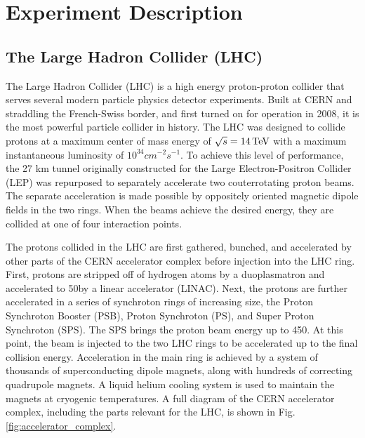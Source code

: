 \chapter{Experiment Description}

\section{The Large Hadron Collider (LHC)}
The Large Hadron Collider (LHC) is a high energy proton-proton collider that serves several modern particle physics detector experiments. 
Built at CERN and straddling the French-Swiss border, and first turned on for operation in 2008, it is the most powerful particle collider in history. 
The LHC was designed to collide protons at a maximum center of mass energy of $\sqrt s = 14\,\text{Te\hspace{-.08em}V}$ 
with a maximum instantaneous luminosity of $10^{34}cm^{-2}s^{-1}$. To achieve this level of performance, the 27 km tunnel 
originally constructed for the Large Electron-Positron Collider (LEP) was repurposed to separately 
accelerate two couterrotating proton beams. The separate acceleration is made possible by oppositely oriented 
magnetic dipole fields in the two rings. When the beams achieve the desired energy, they are collided at one of four interaction points. 

The protons collided in the LHC are first gathered, bunched, and accelerated by other parts of the CERN accelerator complex before injection into the LHC ring. 
First, protons are stripped off of hydrogen atoms by a duoplasmatron and accelerated to 50\MeV by a linear accelerator (LINAC). Next, the protons are further accelerated 
in a series of synchroton rings of increasing size, the Proton Synchroton Booster (PSB), Proton Synchroton (PS), and Super Proton Synchroton (SPS). The SPS brings the 
proton beam energy up to 450\GeV. At this point, the beam is injected to the two LHC rings to be accelerated up to the final collision energy. Acceleration in the main 
ring is achieved by a system of thousands of superconducting dipole magnets, along with hundreds of correcting quadrupole magnets. A liquid helium cooling system is 
used to maintain the magnets at cryogenic temperatures. A full diagram of the CERN accelerator complex, including the parts relevant for the LHC, is shown in Fig. \ref{fig:accelerator_complex}.

